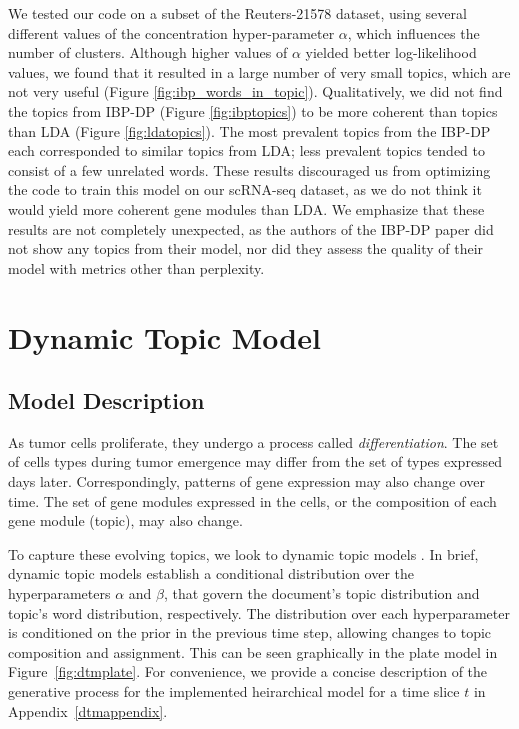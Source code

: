 \documentclass{article}
\begin{document}
We tested our code on a subset of the Reuters-21578 dataset, using several different values of the concentration hyper-parameter $\alpha$, which influences the number of clusters. Although higher values of $\alpha$ yielded better log-likelihood values, we found that it resulted in a large number of very small topics, which are not very useful (Figure \ref{fig:ibp_words_in_topic}). Qualitatively, we did not find the topics from IBP-DP (Figure \ref{fig:ibptopics}) to be more coherent than topics than LDA (Figure \ref{fig:ldatopics}). The most prevalent topics from the IBP-DP each corresponded to similar topics from LDA; less prevalent topics tended to consist of a few unrelated words. These results discouraged us from optimizing the code to train this model on our scRNA-seq dataset, as we do not think it would yield more coherent gene modules than LDA. We emphasize that these results are not completely unexpected, as the authors of the IBP-DP paper did not show any topics from their model, nor did they assess the quality of their model with metrics other than perplexity.

\section{Dynamic Topic Model} 
\label{dtmsec}
\subsection{Model Description} 
As tumor cells proliferate, they undergo a process called \textit{differentiation}. The set of cells types during tumor emergence may differ from the set of types expressed days later. Correspondingly, patterns of gene expression may also change over time. The set of gene modules expressed in the cells, or the composition of each gene module (topic), may also change.

To capture these evolving topics, we look to dynamic topic models \cite{dtm}. In brief, dynamic topic models establish a conditional distribution over the hyperparameters $\alpha$ and $\beta$, that govern the document's topic distribution and topic's word distribution, respectively. The distribution over each hyperparameter is conditioned on the prior in the previous time step, allowing changes to topic composition and assignment. This can be seen graphically in the plate
model in Figure~\ref{fig:dtmplate}. For convenience, we provide a concise description of the generative process for the implemented heirarchical model for a time slice $t$ in Appendix~\ref{dtmappendix}.
\end{document}
